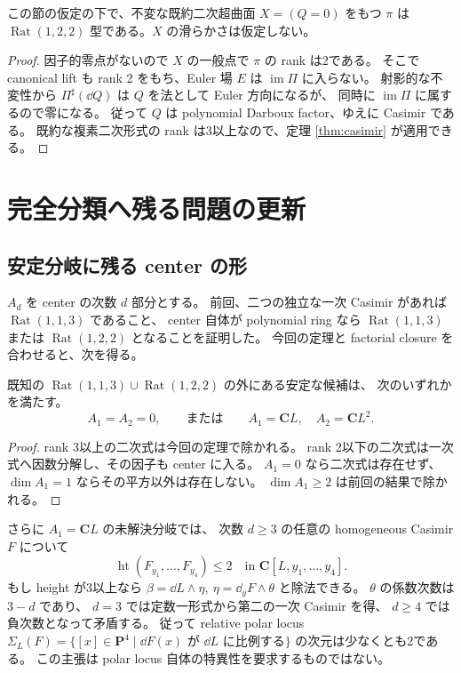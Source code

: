 \documentclass[11pt,a4paper]{ltjsarticle}
\newcommand{\PP}{\mathbf P}\renewcommand{\AA}{\mathbf A}\newcommand{\CC}{\mathbf C}\newcommand{\QQ}{\mathbf Q}
\DeclareMathOperator{\Rat}{Rat}\DeclareMathOperator{\Aff}{Aff}\DeclareMathOperator{\Aut}{Aut}
\DeclareMathOperator{\htop}{ht}
\theoremstyle{remark}\newtheorem{remark}[theorem]{注意}\renewcommand{\proofname}{証明}
\begin{document}
\begin{corollary}[不変な既約二次超曲面]\label{cor:invariantquadric}
この節の仮定の下で、不変な既約二次超曲面 $X=(Q=0)$ をもつ $\pi$ は
$\Rat(1,2,2)$ 型である。$X$ の滑らかさは仮定しない。
\end{corollary}
\begin{proof}
因子的零点がないので $X$ の一般点で $\pi$ の rank は2である。
そこで canonical lift も rank 2 をもち、Euler 場 $E$ は $\operatorname{im}\Pi$ に入らない。
射影的な不変性から $\Pi^\sharp(\dd Q)$ は $Q$ を法として Euler 方向になるが、
同時に $\operatorname{im}\Pi$ に属するので零になる。
従って $Q$ は polynomial Darboux factor、ゆえに Casimir である。
既約な複素二次形式の rank は3以上なので、定理 \ref{thm:casimir} が適用できる。
\end{proof}

\section{完全分類へ残る問題の更新}\label{sec:remaining}
\subsection{安定分岐に残る center の形}
$A_d$ を center の次数 $d$ 部分とする。
前回、二つの独立な一次 Casimir があれば $\Rat(1,1,3)$ であること、
center 自体が polynomial ring なら
$\Rat(1,1,3)$ または $\Rat(1,2,2)$ となることを証明した。
今回の定理と factorial closure を合わせると、次を得る。

\begin{corollary}\label{cor:center}
既知の $\Rat(1,1,3)\cup\Rat(1,2,2)$ の外にある安定な候補は、
次のいずれかを満たす。
\[
 A_1=A_2=0,\qquad\text{または}\qquad
 A_1=\CC L,\quad A_2=\CC L^2.
\]
\end{corollary}
\begin{proof}
rank 3以上の二次式は今回の定理で除かれる。
rank 2以下の二次式は一次式へ因数分解し、その因子も center に入る。
$A_1=0$ なら二次式は存在せず、$\dim A_1=1$ ならその平方以外は存在しない。
$\dim A_1\ge2$ は前回の結果で除かれる。
\end{proof}

さらに $A_1=\CC L$ の未解決分岐では、
次数 $d\ge3$ の任意の homogeneous Casimir $F$ について
\[
 \htop(F_{y_1},\ldots,F_{y_4})\le2
 \quad\text{in }\CC[L,y_1,\ldots,y_4].
\]
もし height が3以上なら
$\beta=\dd L\wedge\eta,\ \eta=\dd_yF\wedge\theta$ と除法できる。
$\theta$ の係数次数は $3-d$ であり、
$d=3$ では定数一形式から第二の一次 Casimir を得、
$d\ge4$ では負次数となって矛盾する。
従って relative polar locus
$\Sigma_L(F)=\{[x]\in\PP^4\mid \dd F(x)\text{ が }\dd L\text{ に比例する}\}$
の次元は少なくとも2である。
この主張は polar locus 自体の特異性を要求するものではない。
\end{document}

